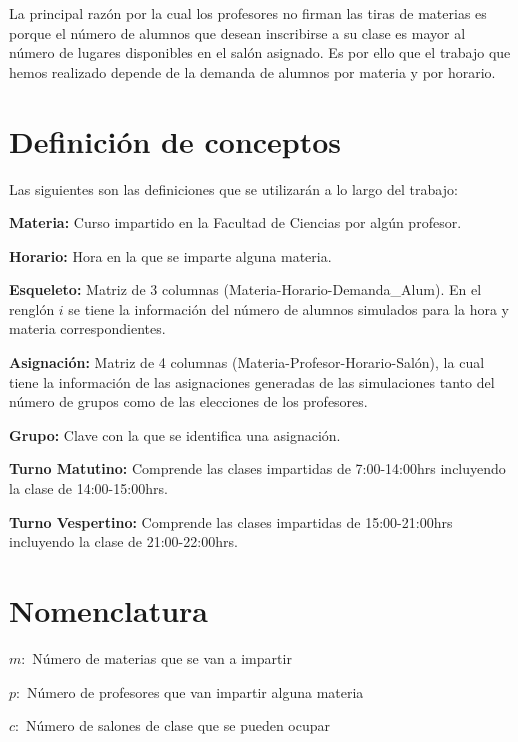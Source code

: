 La principal razón por la cual los profesores no firman las tiras de materias es porque el número de alumnos que desean inscribirse a su clase es mayor al número de lugares disponibles en el salón asignado. Es por ello que el trabajo que hemos realizado depende de la demanda de alumnos por materia y por horario.



\section{Definición de conceptos}

Las siguientes son las definiciones que se utilizarán a lo largo del trabajo:

\textbf{Materia:} Curso impartido en la Facultad de Ciencias por algún profesor.

\textbf{Horario:} Hora en la que se imparte alguna materia.

\textbf{Esqueleto:} Matriz de 3 columnas (Materia-Horario-Demanda\_Alum). En el renglón $i$ se tiene la información del número de alumnos simulados para la hora y materia correspondientes.

\textbf{Asignación:} Matriz de 4 columnas (Materia-Profesor-Horario-Salón), la cual tiene la información de las asignaciones generadas de las simulaciones tanto del número de grupos como de las elecciones de los profesores.

\textbf{Grupo:} Clave con la que se identifica una asignación.

\textbf{Turno Matutino:} Comprende las clases impartidas de 7:00-14:00hrs incluyendo la clase de 14:00-15:00hrs.

\textbf{Turno Vespertino:} Comprende las clases impartidas de 15:00-21:00hrs incluyendo la clase de 21:00-22:00hrs.


\section{Nomenclatura}

$m:$ Número de materias que se van a impartir

$p:$ Número de profesores que van impartir alguna materia

$c:$ Número de salones de clase que se pueden ocupar

